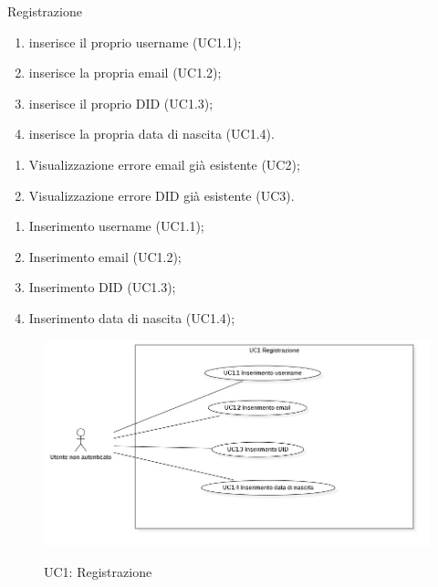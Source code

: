 \begin{usecase}{1}{Registrazione}\label{uc:registrazione}

\begin{enumerate}
  \item inserisce il proprio username (UC1.1);
  \item inserisce la propria email (UC1.2);
  \item inserisce il proprio DID (UC1.3);
  \item inserisce la propria data di nascita (UC1.4).
\end{enumerate}

\usecaseext{}
\begin{enumerate}
  \item Visualizzazione errore email già esistente (UC2);
  \item Visualizzazione errore DID già esistente (UC3).
\end{enumerate}

\begin{enumerate}
  \item Inserimento username (UC1.1);
  \item Inserimento email (UC1.2);
  \item Inserimento DID (UC1.3);
  \item Inserimento data di nascita (UC1.4);
\end{enumerate}
\end{usecase}

\begin{figure}[!ht] 
  \centering 
  \includegraphics[width=0.9\columnwidth, alt={Caso d'uso relativo alla registrazione}]{immagini/usecase/UC1.jpg}
  \caption{UC1: Registrazione}\label{fig:uc:registrazione}
\end{figure}

